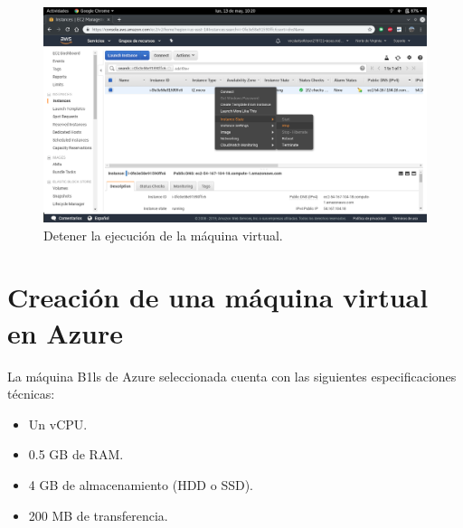 \begin{enumerate}
\begin{figure}[h]
		\centering
		\includegraphics[scale=0.28]{ImagenesAWS/MV/19.png}
		\caption{Detener la ejecución de la máquina virtual.}
		\label{Detener la ejecución de la máquina virtual}
	\end{figure}
\end{enumerate}

\newpage
\section{Creación de una máquina virtual en Azure}
La máquina B1ls de Azure seleccionada cuenta con las siguientes especificaciones técnicas:
\begin{itemize}
	\item Un vCPU.
	\item 0.5 GB de RAM.
	\item 4 GB de almacenamiento (HDD o SSD).
	\item 200 MB de transferencia.
\end{itemize}

